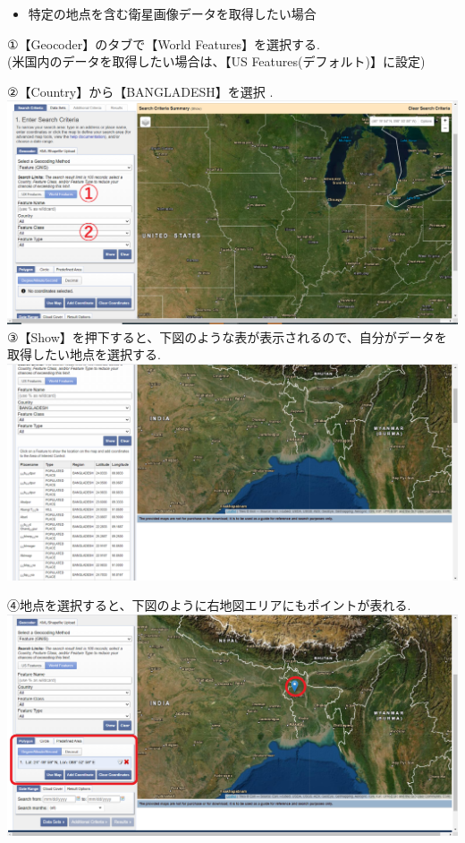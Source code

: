 \documentclass[
]{book}
\providecommand{\tightlist}{%
  \setlength{\itemsep}{0pt}\setlength{\parskip}{0pt}}
\begin{document}
\begin{itemize}
\tightlist
\item
  特定の地点を含む衛星画像データを取得したい場合
\end{itemize}

①【Geocoder】のタブで【World Features】を選択する.\\
(米国内のデータを取得したい場合は、【US Features(デフォルト)】に設定)

②【Country】から【BANGLADESH】を選択 .\\
\includegraphics{images/area1.png}
③【Show】を押下すると、下図のような表が表示されるので、自分がデータを取得したい地点を選択する.
\includegraphics{images/table1.png}

④地点を選択すると、下図のように右地図エリアにもポイントが表れる.
\includegraphics{images/showarea.png}
\end{document}
